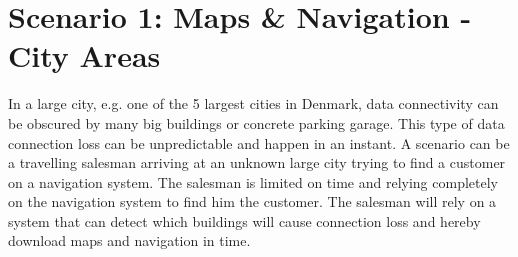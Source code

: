 \section{Scenario 1: Maps \& Navigation - City Areas}
In a large city, e.g. one of the 5 largest cities in Denmark, data connectivity can be obscured by many big buildings or concrete parking garage. This type of data connection loss can be unpredictable and happen in an instant. A scenario can be a travelling salesman arriving at an unknown large city trying to find a customer on a navigation system. The salesman is limited on time and relying completely on the navigation system to find him the customer. The salesman will rely on a system that can detect which buildings will cause connection loss and hereby download maps and navigation in time.